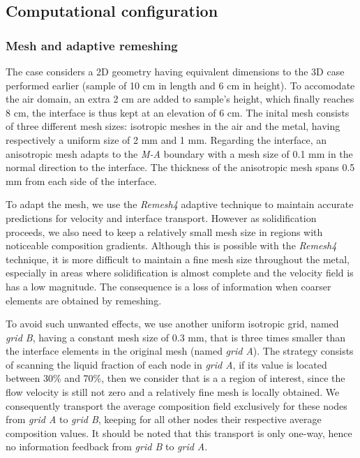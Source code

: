 \subsection{Computational configuration}


\subsubsection{Mesh and adaptive remeshing}
The case considers a 2D geometry having equivalent dimensions to the 3D case performed earlier (sample of 10 cm in length and 6 cm in height).
To accomodate the air domain, an extra 2 cm are added to sample's height, which finally reaches 8 cm, the interface is thus kept at an elevation of 6 cm. 
The inital mesh consists of three different mesh sizes: isotropic meshes in the air and the metal, having respectively a uniform size of 2 mm and 1 mm.
Regarding the interface, an anisotropic mesh adapts to the \emph{M-A} boundary with a mesh size of 0.1 mm in the normal direction to the interface.
The thickness of the anisotropic mesh spans 0.5 mm from each side of the interface.

To adapt the mesh, we use the \emph{Remesh4} adaptive technique to maintain accurate predictions for velocity and interface transport.
However as solidification proceeds, we also need to keep a relatively small mesh size in regions with noticeable composition gradients.
Although this is possible with the \emph{Remesh4} technique, it is more difficult to maintain a fine mesh size throughout the metal, especially in areas
where solidification is almost complete and the velocity field is has a low magnitude. The consequence is a loss of information when coarser 
elements are obtained by remeshing.

To avoid such unwanted effects, we use another uniform
isotropic grid, named \emph{grid B}, having a constant mesh size of 0.3 mm, that is three times smaller than the interface elements in the original mesh (named \emph{grid A}).
The strategy consists of scanning the liquid fraction of each node in \emph{grid A}, if its value is located between 30\% and 70\%, then we consider that is a 
a region of interest, since the flow velocity is still not zero and a relatively fine mesh is locally obtained. 
We consequently transport the average composition field exclusively 
for these nodes from \emph{grid A} to \emph{grid B}, keeping for all other nodes their respective average composition values.
It should be noted that this transport is only one-way, hence no information feedback from \emph{grid B} to \emph{grid A}.

